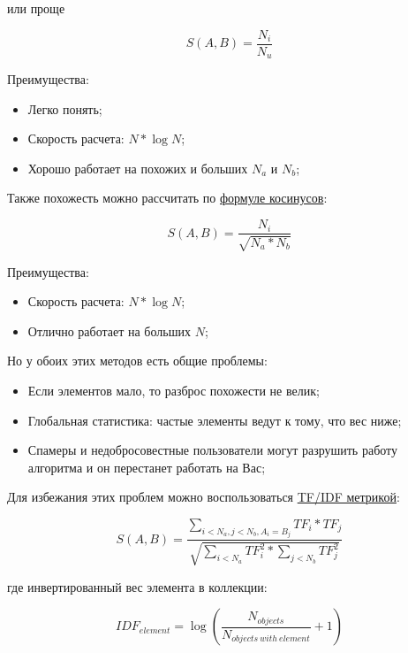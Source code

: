 или проще

\begin{equation}
 \label{eq:smlar2}
 S(A,B) = \frac{N_{i}}{N_{u}}
\end{equation}

Преимущества:

\begin{itemize}
  \item Легко понять;
  \item Скорость расчета: $N * \log{N}$;
  \item Хорошо работает на похожих и больших $N_a$ и $N_b$;
\end{itemize}

Также похожесть можно рассчитать по \href{http://en.wikipedia.org/wiki/Law\_of\_cosines}{формуле косинусов}:

\begin{equation}
 \label{eq:smlar3}
 S(A,B) = \frac{N_{i}}{\sqrt{N_{a}*N_{b}}}
\end{equation}

Преимущества:

\begin{itemize}
  \item Скорость расчета: $N * \log{N}$;
  \item Отлично работает на больших $N$;
\end{itemize}

Но у обоих этих методов есть общие проблемы:

\begin{itemize}
  \item Если элементов мало, то разброс похожести не велик;
  \item Глобальная статистика: частые элементы ведут к тому, что вес ниже;
  \item Спамеры и недобросовестные пользователи могут разрушить работу алгоритма и он перестанет работать на Вас;
\end{itemize}

Для избежания этих проблем можно воспользоваться \href{http://en.wikipedia.org/wiki/Tf*idf}{TF/IDF метрикой}:

\begin{equation}
 \label{eq:smlar4}
 S(A,B) = \frac{\sum_{i < N_{a}, j < N_{b}, A_{i} = B_{j}}TF_{i} * TF_{j}}{\sqrt{\sum_{i < N_{a}}TF_{i}^{2} * \sum_{j < N_{b}}TF_{j}^{2}}}
\end{equation}

где инвертированный вес элемента в коллекции:

\begin{equation}
 \label{eq:smlar5}
 IDF_{element} = \log{(\frac{N_{objects}}{N_{objects\ with\ element}} + 1)}
\end{equation}

